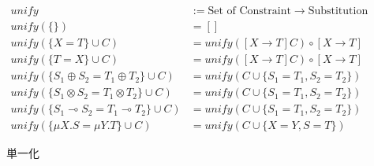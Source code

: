 \documentclass[a4j, dvipdfmx]{jsarticle}
\theoremstyle{definition}
\begin{document}
\begin{figure}[H]
  \begin{align*}
    unify    &:= \text{Set of Constraint} \rightarrow \text{Substitution} \\
    unify(\{\})             &= [] \\
    unify(\{X = T\} \cup C) &= unify([X \rightarrow T]C) \circ [X \rightarrow T] \\
    unify(\{T = X\} \cup C) &= unify([X \rightarrow T]C) \circ [X \rightarrow T] \\
    unify(\{S_1 \oplus S_2 = T_1 \oplus T_2\} \cup C) &= unify(C \cup \{S_1 = T_1, S_2 = T_2\}) \\
    unify(\{S_1 \otimes S_2 = T_1 \otimes T_2\} \cup C) &= unify(C \cup \{S_1 = T_1, S_2 = T_2\}) \\
    unify(\{S_1 \multimap S_2 = T_1 \multimap T_2\} \cup C) &= unify(C \cup \{S_1 = T_1, S_2 = T_2\}) \\
    unify(\{\mu{X}.S = \mu{Y}.T\} \cup C) &= unify(C \cup \{X = Y, S = T\})
  \end{align*}
  \caption{単一化}
  \label{fig:unification}
\end{figure}
\end{document}
